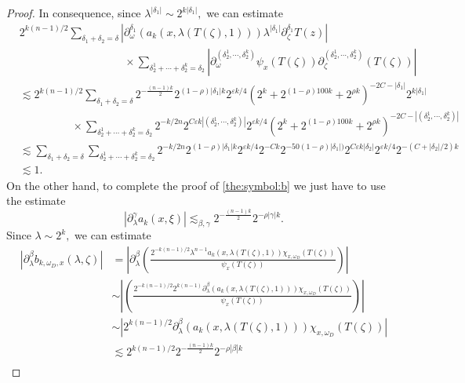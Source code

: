 \documentclass[12pt, reqno]{amsart}
\theoremstyle{definition}
\theoremstyle{remark}
\numberwithin{equation}{section}
\begin{document}
\begin{proof}
In consequence, since $\lambda^{|\delta_1|}\sim 2^{k|\delta_1|},$ we can estimate
\begin{align*}
    &2^{k(n-1)/2}\sum_{\delta_1+\delta_2=\delta}|\partial_{\omega}^{\delta_1}(a_k(x,\lambda(T(\zeta),1))  )\lambda^{|\delta_1|}\partial_\zeta^{\delta_1} T(z)  |\\
    &\hspace{4cm}\times \sum_{\delta_2^1+\cdots +\delta_2^k=\delta_2}  | \partial_{\omega}^{(\delta_2^{1},\cdots,\delta_2^{k}) } \psi_{x}(T(\zeta)) \partial_{\zeta}^{ (\delta_2^{1},\cdots,\delta_2^{k}) }(T(\zeta))    | \\
    &\lesssim 2^{k(n-1)/2} \sum_{\delta_1+\delta_2=\delta} 2^{-\frac{(n-1)k}{2}}  2^{(1-\rho)|\delta_1|k}2^{\varepsilon k/4}(2^{ k}+2^{(1-\rho)100 k}+2^{\rho k})^{-2C-|\delta_1|}2^{k|\delta_1|}\\
    &\hspace{2cm} \times \sum_{\delta_2^1+\cdots +\delta_2^k=\delta_2}2^{-k/2n} 2^{C\varepsilon k|(\delta_2^{1},\cdots,\delta_2^{k})| }2^{\varepsilon k/4}(2^{ k}+2^{(1-\rho)100 k}+2^{\rho k})^{-2C-|(\delta_2^{1},\cdots,\delta_2^{k})|}\\
    &\lesssim \sum_{\delta_1+\delta_2=\delta} \sum_{\delta_2^1+\cdots +\delta_2^k=\delta_2}2^{-k/2n} 2^{(1-\rho)|\delta_1|k}   2^{\varepsilon k/4}  2^{-C k}2^{-50(1-\rho)|\delta_1|)}2^{C\varepsilon k|\delta_2|}2^{\varepsilon k/4}2^{-(C+|\delta_2|/2)k}\\
    &\lesssim 1.
\end{align*}On the other hand, to complete the proof of \eqref{the:symbol:b} we just have to use the estimate 
$$  | \partial_{\lambda}^\gamma a_{k}(x,\xi) |\lesssim_{\beta,\gamma} 2^{-\frac{(n-1)k}{2}}2^{-\rho|\gamma|k} .$$ Since $\lambda\sim 2^k,$  we can estimate 
\begin{align*} 
|\partial_{\lambda}^\beta b_{k,\omega_D,x}(\lambda,\zeta)| &=|\partial_{\lambda}^\beta \left(   \frac{2^{-k(n-1)/2} \lambda^{n-1}a_k(x,\lambda(T(\zeta),1)) \chi_{x,\omega_D}(T(\zeta))  }{\psi_{x}(T(\zeta))}\right)| \\
&\sim \left| \left(   \frac{2^{-k(n-1)/2} 2^{k(n-1)}\partial_{\lambda}^\beta (a_k(x,\lambda(T(\zeta),1))) \chi_{x,\omega_D}(T(\zeta))  }{\psi_{x}(T(\zeta))}\right)\right|\\
&\sim \left|   {2^{k(n-1)/2}\partial_{\lambda}^\beta (a_k(x,\lambda(T(\zeta),1))) \chi_{x,\omega_D}(T(\zeta))  }\right|\\
&\lesssim 2^{k(n-1)/2}  2^{-\frac{(n-1)k}{2}}2^{-\rho|\beta|k}\\

\end{align*}
\end{proof}
\end{document}
